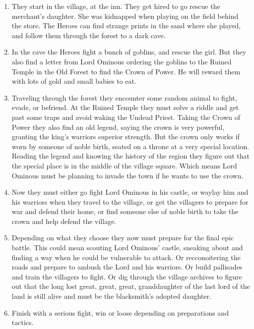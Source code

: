 \begin{enumerate}

\item They start in the village, at the inn. They get hired to go rescue the merchant's daughter. She was kidnapped when playing on the field behind the store. The Heroes can find strange prints in the sand where she played, and follow them through the forest to a dark cave.

\item In the cave the Heroes fight a bunch of goblins, and rescue the girl. But they also find a letter from Lord Ominous ordering the goblins to the Ruined Temple in the Old Forest to find the Crown of Power. He will reward them with lots of gold and small babies to eat.

\item Traveling through the forest they encounter some random animal to fight, evade, or befriend. At the Ruined Temple they must solve a riddle and get past some traps and avoid waking the Undead Priest.
Taking the Crown of Power they also find an old legend, saying the crown is very powerful, granting the king's warriors superior strength. But the crown only works if worn by someone of noble birth, seated on a throne at a very special location. Reading the legend and knowing the history of the region they figure out that the special place is in the middle of the village square. Which means Lord Ominous must be planning to invade the town if he wants to use the crown.

\item Now they must either go fight Lord Ominous in his castle, or waylay him and his warriors when they travel to the village, or get the villagers to prepare for war and defend their home, or find someone else of noble birth to take the crown and help defend the village.

\item Depending on what they choose they now must prepare for the final epic battle. This could mean scouting Lord Ominous' castle, sneaking about and finding a way when he could be vulnerable to attack. Or recconoitering the roads and prepare to ambush the Lord and his warriors. Or build pallisades and train the villagers to fight. Or dig through the village archives to figure out that the long lost great, great, great, granddaughter of the last lord of the land is still alive and must be the blacksmith's adopted daughter.

\item Finish with a serious fight, win or loose depending on preparations and tactics.

\end{enumerate}

